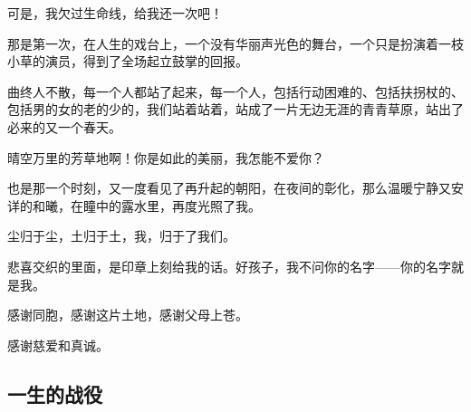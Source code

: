 \par 可是，我欠过生命线，给我还一次吧！
\par 那是第一次，在人生的戏台上，一个没有华丽声光色的舞台，一个只是扮演着一枝小草的演员，得到了全场起立鼓掌的回报。
\par 曲终人不散，每一个人都站了起来，每一个人，包括行动困难的、包括扶拐杖的、包括男的女的老的少的，我们站着站着，站成了一片无边无涯的青青草原，站出了必来的又一个春天。
\par 晴空万里的芳草地啊！你是如此的美丽，我怎能不爱你？
\par 也是那一个时刻，又一度看见了再升起的朝阳，在夜间的彰化，那么温暖宁静又安详的和曦，在瞳中的露水里，再度光照了我。
\par 尘归于尘，土归于土，我，归于了我们。
\par 悲喜交织的里面，是印章上刻给我的话。好孩子，我不问你的名字——你的名字就是我。
\par 感谢同胞，感谢这片土地，感谢父母上苍。
\par 感谢慈爱和真诚。



\subsection{一生的战役}



